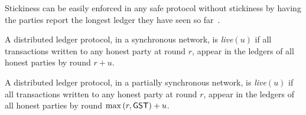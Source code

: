 Stickiness can be easily enforced in any safe protocol
without stickiness by having the parties report the longest
ledger they have seen so far~\cite{streamlet}.

\begin{definition}
  A distributed ledger protocol, in a synchronous network, is \emph{live}$(u)$ if
  all transactions written to any honest party
  at round $r$, appear in the ledgers of all honest parties by round
  $r + u$.
\end{definition}

\begin{definition}
  A distributed ledger protocol, in a partially synchronous network,
  is \emph{live}$(u)$ if all transactions written to any honest party
  at round $r$, appear in the ledgers of all honest parties by round
  $\max{(r,\textsf{GST})} + u$.
\end{definition}

